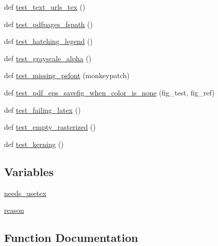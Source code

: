 \begin{DoxyCompactItemize}
def \hyperlink{namespacematplotlib_1_1tests_1_1test__backend__pdf_a3959142f174fcbbbfbfb04b291e2a54a}{test\+\_\+text\+\_\+urls\+\_\+tex} ()
\item 
def \hyperlink{namespacematplotlib_1_1tests_1_1test__backend__pdf_a95964775ffd010b6cb85dacecdd10a38}{test\+\_\+pdfpages\+\_\+fspath} ()
\item 
def \hyperlink{namespacematplotlib_1_1tests_1_1test__backend__pdf_a2828d4ab559207da6233e7325349da05}{test\+\_\+hatching\+\_\+legend} ()
\item 
def \hyperlink{namespacematplotlib_1_1tests_1_1test__backend__pdf_a76e2b784780a26171af672e084ff1f82}{test\+\_\+grayscale\+\_\+alpha} ()
\item 
def \hyperlink{namespacematplotlib_1_1tests_1_1test__backend__pdf_a408530d4708ed4ef158de009c5257802}{test\+\_\+missing\+\_\+psfont} (monkeypatch)
\item 
def \hyperlink{namespacematplotlib_1_1tests_1_1test__backend__pdf_af19e7d1a412e31419920a7d49fb0bff7}{test\+\_\+pdf\+\_\+eps\+\_\+savefig\+\_\+when\+\_\+color\+\_\+is\+\_\+none} (fig\+\_\+test, fig\+\_\+ref)
\item 
def \hyperlink{namespacematplotlib_1_1tests_1_1test__backend__pdf_aeeed5f4dcf951c94b4f06dbd14f8ea86}{test\+\_\+failing\+\_\+latex} ()
\item 
def \hyperlink{namespacematplotlib_1_1tests_1_1test__backend__pdf_af3d0a69c1f6965c0be987cdb52b06e05}{test\+\_\+empty\+\_\+rasterized} ()
\item 
def \hyperlink{namespacematplotlib_1_1tests_1_1test__backend__pdf_a3b44f940071f736cdfc9e0190e3dea82}{test\+\_\+kerning} ()
\end{DoxyCompactItemize}
\subsection*{Variables}
\begin{DoxyCompactItemize}
\item 
\hyperlink{namespacematplotlib_1_1tests_1_1test__backend__pdf_af439c699e3646b24284f5eff3d7b3c3b}{needs\+\_\+usetex}
\item 
\hyperlink{namespacematplotlib_1_1tests_1_1test__backend__pdf_a56313e9370acfcb7482412f70fd01dde}{reason}
\end{DoxyCompactItemize}


\subsection{Function Documentation}
\mbox{\label{namespacematplotlib_1_1tests_1_1test__backend__pdf_a02ecf9ca7c7f62a808277707d21525b3}} 
